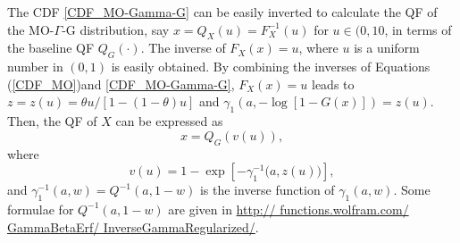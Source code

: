 \documentclass[twoside,leqno,11pt]{article}
\begin{document}
\vspace{0.6cm}

The CDF \eqref{CDF_MO-Gamma-G} can be easily inverted to calculate the QF of the MO-$\Gamma$-G distribution,
say $x=Q_{X}(u)=F_X^{-1}(u)$ for $u \in (0,10$, in terms of the baseline QF $Q_G(\cdot)$. The inverse of
$F_{X}(x)=u$, where $u$ is a uniform number in $(0,1)$ is easily obtained. By combining the inverses
of Equations (\ref{CDF_MO})and \eqref{CDF_MO-Gamma-G}, $F_{X}(x)=u$ leads to
$z=z(u)=\theta u/[1-(1-\theta)u]$ and $\gamma_{1}\left(a, -\log[1-G(x)]\right)=z(u)$.
Then, the QF of $X$ can be expressed as
$$x=Q_G\left(v(u)\right),$$
where
$$v(u)=1-\exp\left[-\gamma_1^{-1}\big(a,z(u)\big)\right],$$
and $\gamma_1^{-1}(a,w)=Q^{-1}(a,1-w)$ is the inverse function of $\gamma_1(a,w)$. Some formulae for
$Q^{-1}(a,1-w)$ are given in \url{http:// functions.wolfram.com/ GammaBetaErf/ InverseGammaRegularized/}.
\end{document}
